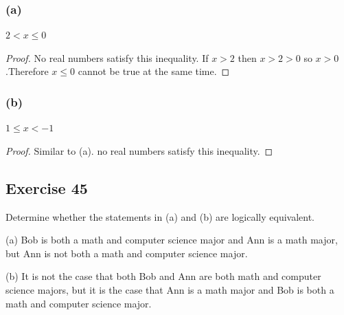 \documentclass[14pt]{extarticle}
\begin{document}
\subsubsection{(a)} 
$2 < x \leq 0$

\begin{proof} 
No real numbers satisfy this inequality. If $x > 2$ then $x > 2 > 0$ so $x > 0$.Therefore $x \leq 0$ cannot be true at the same time. 
\end{proof}

\subsubsection{(b)} 
$1 \leq x < -1$

\begin{proof} 
Similar to (a). no real numbers satisfy this inequality.
\end{proof}

\subsection{Exercise 45} 
Determine whether the statements in (a) and (b) are logically equivalent.

(a) Bob is both a math and computer science major and Ann is a math major, but Ann is not both a math and computer science major.

(b) It is not the case that both Bob and Ann are both math and computer science majors, but it is the case that Ann is a math major and Bob is both a math and computer science major.
\end{document}
